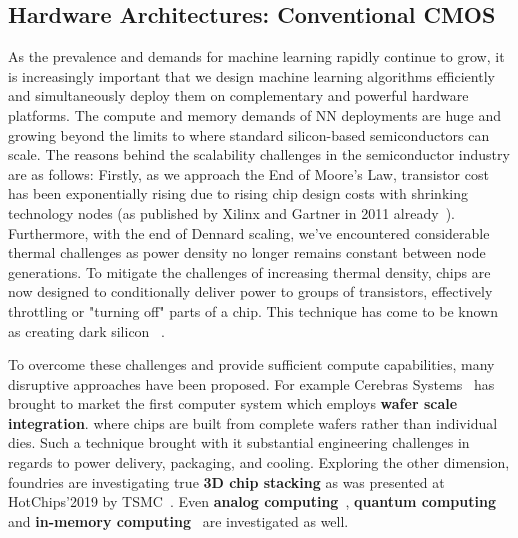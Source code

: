 



\subsection{Hardware Architectures: Conventional CMOS}
\label{sec:cmos}
As the prevalence and demands for machine learning rapidly continue to grow, it is increasingly important that we design machine learning algorithms efficiently and simultaneously deploy them on complementary and powerful hardware platforms. The compute and memory demands of NN deployments are huge and growing beyond the limits to where standard silicon-based semiconductors can scale.  The reasons behind the scalability challenges in the semiconductor industry are as follows:
Firstly, as we approach the End of Moore's Law, transistor cost has been exponentially rising due to rising chip design costs with shrinking technology nodes (as published by Xilinx and Gartner in 2011 already~\cite{trimberger2018three}). Furthermore, with the end of Dennard scaling, we've encountered considerable thermal challenges as power density no longer remains constant between node generations. To mitigate the challenges of increasing thermal density, chips are now designed to conditionally deliver power to groups of transistors, effectively throttling or "turning off" parts of a chip. This technique has come to be known as creating dark silicon ~\cite{esmaeilzadeh2011dark}.

To overcome these challenges and provide sufficient compute capabilities, many disruptive approaches have been proposed. For example Cerebras Systems~\cite{cerebras} has brought to market the first computer system which employs \textbf{wafer scale integration}.  where chips are built from complete wafers rather than individual dies. Such a technique brought with it substantial engineering challenges in regards to power delivery, packaging, and cooling. Exploring the other dimension, foundries are investigating true \textbf{3D chip stacking} as was presented at HotChips'2019 by TSMC~\cite{TSMC}. Even \textbf{analog computing}~\cite{aspinity,yuzuguler2019analog}, \textbf{quantum computing}~\cite{dwave} and \textbf{in-memory computing}~\cite{neuroblade,essera2016convolutional} are investigated as well. %

